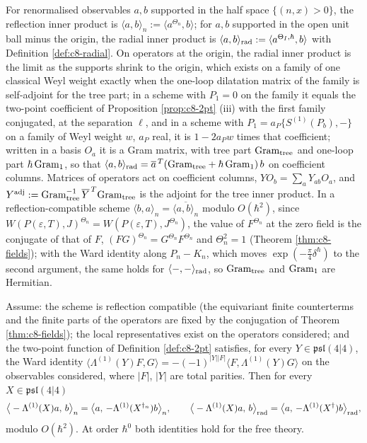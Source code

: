 \begin{definition}
\label{def:c8-inner}
For renormalised observables $a,b$ supported in the half space $\{(n,x)>0\}$, the reflection inner product is $\langle a,b\rangle_n:=\langle a^{\Theta_n},b\rangle$; for $a,b$ supported in the open unit ball minus the origin, the radial inner product is $\langle a,b\rangle_{\rm rad}:=\langle a^{\Theta_I,\hbar},b\rangle$ with Definition \ref{def:c8-radial}. On operators at the origin, the radial inner product is the limit as the supports shrink to the origin, which exists on a family of one classical Weyl weight exactly when the one-loop dilatation matrix of the family is self-adjoint for the tree part; in a scheme with $P_1=0$ on the family it equals the two-point coefficient of Proposition \ref{prop:c8-2pt} (iii) with the first family conjugated, at the separation $\ell$, and in a scheme with $P_1=a_P\{S^{(1)}(P_b),-\}$ on a family of Weyl weight $w$, $a_P$ real, it is $1-2a_Pw$ times that coefficient; written in a basis $O_a$ it is a Gram matrix, with tree part $\mathrm{Gram}_{\rm tree}$ and one-loop part $\hbar\,\mathrm{Gram}_{\rm 1}$, so that $\langle a,b\rangle_{\rm rad}=\overline a^{\,T}(\mathrm{Gram}_{\rm tree}+\hbar\,\mathrm{Gram}_{\rm 1})\,b$ on coefficient columns. Matrices of operators act on coefficient columns, $YO_b=\sum_aY_{ab}O_a$, and $Y^{\rm adj}:=\mathrm{Gram}_{\rm tree}^{-1}\,\overline{Y}^{\,T}\mathrm{Gram}_{\rm tree}$ is the adjoint for the tree inner product. In a reflection-compatible scheme $\langle b,a\rangle_n=\overline{\langle a,b\rangle_n}$ modulo $O(\hbar^2)$, since $W(P(\varepsilon,T),J)^{\Theta_n}=W(P(\varepsilon,T),J^{\Theta_n})$, the value of $F^{\Theta_n}$ at the zero field is the conjugate of that of $F$, $(FG)^{\Theta_n}=G^{\Theta_n}F^{\Theta_n}$ and $\Theta_n^2=1$ (Theorem \ref{thm:c8-fields}); with the Ward identity along $P_n-K_n$, which moves $\exp(-\tfrac\pi4\delta^\hbar)$ to the second argument, the same holds for $\langle-,-\rangle_{\rm rad}$, so $\mathrm{Gram}_{\rm tree}$ and $\mathrm{Gram}_{\rm 1}$ are Hermitian.
\end{definition}

\begin{theorem}[Adjointness]
\label{thm:c8-adjoint}
Assume: the scheme is reflection compatible (the equivariant finite counterterms and the finite parts of the operators are fixed by the conjugation of Theorem \ref{thm:c8-fields}); the local representatives exist on the operators considered; and the two-point function of Definition \ref{def:c8-2pt} satisfies, for every $Y\in\mathfrak{psl}(4|4)$, the Ward identity $\langle\Lambda^{(1)}(Y)F,G\rangle=-(-1)^{|Y||F|}\langle F,\Lambda^{(1)}(Y)G\rangle$ on the observables considered, where $|F|$, $|Y|$ are total parities. Then for every $X\in\mathfrak{psl}(4|4)$
\[
\big\langle-\Lambda^{(1)}(X)a,\,b\big\rangle_n=\big\langle a,\,-\Lambda^{(1)}(X^{\dagger_n})b\big\rangle_n,\qquad
\big\langle-\Lambda^{(1)}(X)a,\,b\big\rangle_{\rm rad}=\big\langle a,\,-\Lambda^{(1)}(X^{\dagger})b\big\rangle_{\rm rad},
\]
modulo $O(\hbar^2)$. At order $\hbar^0$ both identities hold for the free theory.
\end{theorem}

